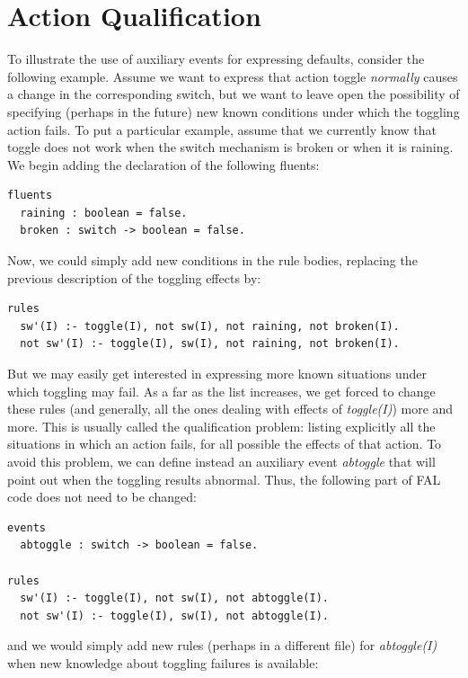 \documentclass[a4paper,12pt]{report}
\begin{document}
\section{Action Qualification}

To illustrate the use of auxiliary events for expressing defaults, consider the following example. Assume we want to express that action toggle {\color{orange} \textit{normally} } causes a change in the corresponding switch, but we want to leave open the possibility of specifying (perhaps in the future) new known conditions under which the toggling action fails. To put a particular example, assume that we currently know that toggle does not work when the switch mechanism is broken or when it is raining. We begin adding the declaration of the following fluents:

\begin{verbatim}
fluents
  raining : boolean = false.
  broken : switch -> boolean = false.
\end{verbatim}

Now, we could simply add new conditions in the rule bodies, replacing the previous description of the toggling effects by:

\begin{verbatim}
rules
  sw'(I) :- toggle(I), not sw(I), not raining, not broken(I).
  not sw'(I) :- toggle(I), sw(I), not raining, not broken(I).
\end{verbatim}

But we may easily get interested in expressing more known situations under which toggling may fail. As a far as the list increases, we get forced to change these rules (and generally, all the ones dealing with effects of \textit{toggle(I)}) more and more. This is usually called the {\color{orange}qualification problem}: listing explicitly all the situations in which an action fails, for all possible the effects of that action. To avoid this problem, we can define instead an auxiliary event \textit{abtoggle} that will point out when the toggling results abnormal. Thus, the following part of FAL code does not need to be changed:

\begin{verbatim}
events
  abtoggle : switch -> boolean = false.

rules
  sw'(I) :- toggle(I), not sw(I), not abtoggle(I).
  not sw'(I) :- toggle(I), sw(I), not abtoggle(I).
\end{verbatim}

and we would simply add new rules (perhaps in a different file) for \textit{abtoggle(I)} when new knowledge about toggling failures is available:
\end{document}
